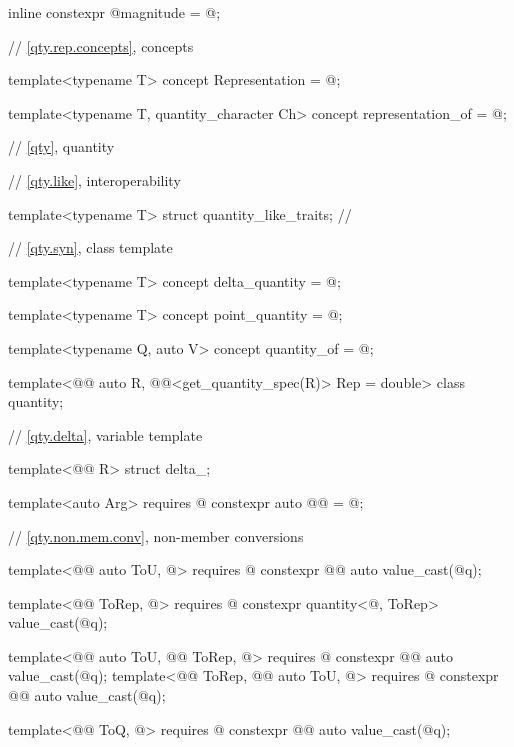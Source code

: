 \begin{codeblock}
{{{    inline constexpr @\unspec@ magnitude = @\unspec@;
  }
}

// \ref{qty.rep.concepts}, concepts

template<typename T>
concept Representation = @\seebelownc@;

template<typename T, quantity_character Ch>
concept representation_of = @\seebelownc@;

// \ref{qty}, quantity

// \ref{qty.like}, interoperability

template<typename T>
struct quantity_like_traits;  // \notdef

// \ref{qty.syn}, class template 

template<typename T>
concept delta_quantity = @\seebelownc@;

template<typename T>
concept point_quantity = @\seebelownc@;

template<typename Q, auto V>
concept quantity_of = @\seebelownc@;

template<@@ auto R, @@<get_quantity_spec(R)> Rep = double>
class quantity;

// \ref{qty.delta}, variable template 

template<@@ R>
struct delta_;

template<auto Arg>
  requires @\seebelownc@
constexpr auto @@ = @\seebelownc@;

// \ref{qty.non.mem.conv}, non-member conversions

template<@@ auto ToU, @\seebelownc@>
  requires @\seebelownc@
constexpr @@ auto value_cast(@\seebelownc@ q);

template<@@ ToRep, @\seebelownc@>
  requires @\seebelownc@
constexpr quantity<@\seebelownc@, ToRep> value_cast(@\seebelownc@ q);

template<@@ auto ToU, @@ ToRep, @\seebelownc@>
  requires @\seebelownc@
constexpr @@ auto value_cast(@\seebelownc@ q);
template<@@ ToRep, @@ auto ToU, @\seebelownc@>
  requires @\seebelownc@
constexpr @@ auto value_cast(@\seebelownc@ q);

template<@@ ToQ, @\seebelownc@>
  requires @\seebelownc@
constexpr @@ auto value_cast(@\seebelownc@ q);

}
\end{codeblock}
